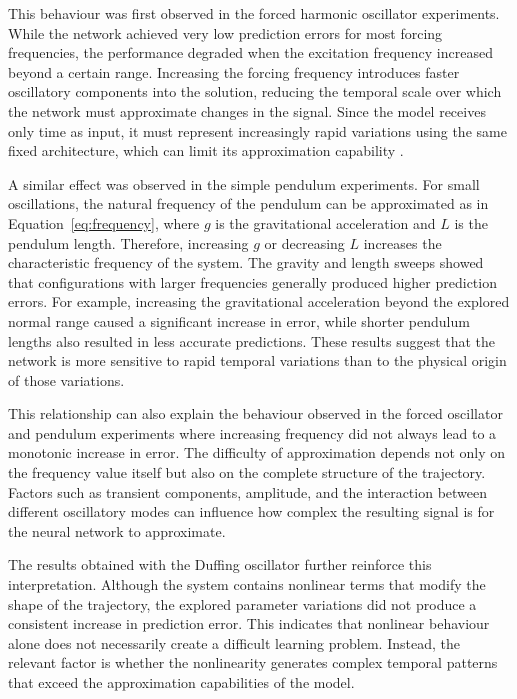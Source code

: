 This behaviour was first observed in the forced harmonic oscillator experiments. While the network achieved very low prediction errors for most forcing frequencies, the performance degraded when the excitation frequency increased beyond a certain range. Increasing the forcing frequency introduces faster oscillatory components into the solution, reducing the temporal scale over which the network must approximate changes in the signal. Since the model receives only time as input, it must represent increasingly rapid variations using the same fixed architecture, which can limit its approximation capability \cite{spectralbias2024}.

A similar effect was observed in the simple pendulum experiments. For small oscillations, the natural frequency of the pendulum can be approximated as in Equation~\ref{eq:frequency}, where $g$ is the gravitational acceleration and $L$ is the pendulum length. Therefore, increasing $g$ or decreasing $L$ increases the characteristic frequency of the system. The gravity and length sweeps showed that configurations with larger frequencies generally produced higher prediction errors. For example, increasing the gravitational acceleration beyond the explored normal range caused a significant increase in error, while shorter pendulum lengths also resulted in less accurate predictions. These results suggest that the network is more sensitive to rapid temporal variations than to the physical origin of those variations.

This relationship can also explain the behaviour observed in the forced oscillator and pendulum experiments where increasing frequency did not always lead to a monotonic increase in error. The difficulty of approximation depends not only on the frequency value itself but also on the complete structure of the trajectory. Factors such as transient components, amplitude, and the interaction between different oscillatory modes can influence how complex the resulting signal is for the neural network to approximate.

The results obtained with the Duffing oscillator further reinforce this interpretation. Although the system contains nonlinear terms that modify the shape of the trajectory, the explored parameter variations did not produce a consistent increase in prediction error. This indicates that nonlinear behaviour alone does not necessarily create a difficult learning problem. Instead, the relevant factor is whether the nonlinearity generates complex temporal patterns that exceed the approximation capabilities of the model.

